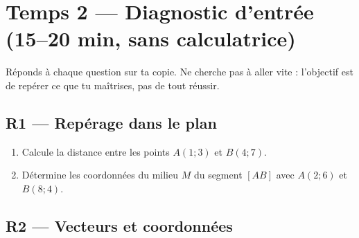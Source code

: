 
\section*{Temps 2 — Diagnostic d'entrée \hfill
\normalfont\small(15–20 min, sans calculatrice)}

Réponds à chaque question sur ta copie. Ne cherche pas à aller vite : l'objectif est de repérer ce que tu maîtrises, pas de tout réussir.

\bigskip

\subsection*{R1 — Repérage dans le plan}

\begin{enumerate}

  \item Calcule la distance entre les points $A(1 ; 3)$ et $B(4 ; 7)$.

  \item Détermine les coordonnées du milieu $M$ du segment $[AB]$ avec $A(2 ; 6)$ et $B(8 ; 4)$.

\end{enumerate}

\subsection*{R2 — Vecteurs et coordonnées}

